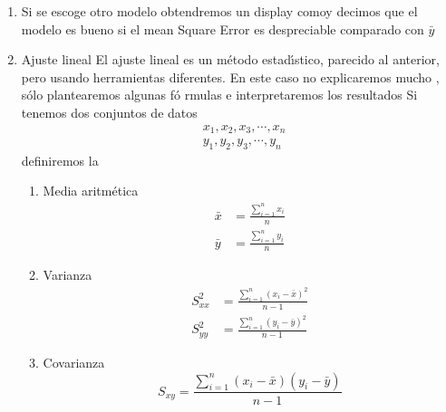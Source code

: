 \documentclass{article}
\begin{document}
\begin{enumerate}
\begin{enumerate}
\begin{enumerate}
\item Si se escoge otro modelo obtendremos un display comoy
decimos que el modelo es bueno si el mean Square Error es despreciable
comparado con $\bar{y}$ %

\item Ajuste lineal\newline
El ajuste lineal es un m\'{e}todo estad\'{\i}stico, parecido al anterior,
pero usando herramientas diferentes.\newline
En este caso no explicaremos mucho , s\'{o}lo plantearemos algunas f\'{o}%
rmulas e interpretaremos los resultados \newline
Si tenemos dos conjuntos de datos 
\begin{align*}
& x_{1},x_{2},x_{3},\cdots,x_{n} \\
& y_{1},y_{2},y_{3},\cdots,y_{n}
\end{align*}
definiremos la

\begin{enumerate}
\item Media aritm\'{e}tica 
\begin{align*}
\bar{x} & =\frac{\sum_{i=1}^{n}x_{i}}{n} \\
\bar{y} & =\frac{\sum_{i=1}^{n}y_{i}}{n}
\end{align*}

\item Varianza 
\begin{align*}
S_{xx}^{2} & =\frac{\sum_{i=1}^{n}(x_{i}-\bar{x})^{2}}{n-1} \\
S_{yy}^{2} & =\frac{\sum_{i=1}^{n}(y_{i}-\bar{y})^{2}}{n-1}
\end{align*}

\item Covarianza 
\begin{equation*}
S_{xy}=\frac{\sum_{i=1}^{n}(x_{i}-\bar{x})(y_{i}-\bar{y})}{n-1}
\end{equation*}


\end{enumerate}
\end{enumerate}
\end{enumerate}
\end{enumerate}
\end{document}
